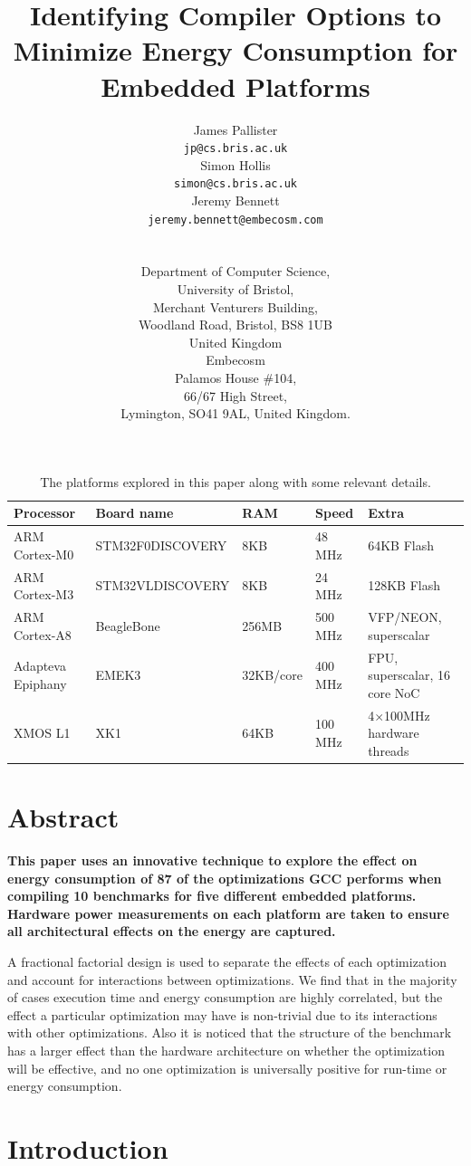 \documentclass[twocolumn]{article}
\title{\bfseries\fontsize{20}{1}\selectfont Identifying Compiler Options to Minimize Energy Consumption for Embedded Platforms}
\author{
\parbox{0.33\linewidth}{\centering\fontsize{13}{1}\selectfont James Pallister\\[0.5em]\texttt{jp@cs.bris.ac.uk}}
\parbox{0.33\linewidth}{\centering\fontsize{13}{1}\selectfont Simon Hollis\\[0.5em]\texttt{simon@cs.bris.ac.uk}}
\parbox{0.33\linewidth}{\centering\fontsize{13}{1}\selectfont Jeremy Bennett\\[0.5em]\texttt{jeremy.bennett@embecosm.com}} \\[1.5em]
\parbox{0.66\linewidth}{\centering\fontsize{12}{1}\selectfont
Department of Computer Science, \\
University of Bristol, \\
Merchant Venturers Building, \\
Woodland Road, Bristol, BS8 1UB\\
United Kingdom}
\parbox{0.33\linewidth}{\centering\fontsize{13}{1}\selectfont
Embecosm \\
Palamos House \#104, \\
66/67 High Street, \\
Lymington, SO41 9AL, United Kingdom. \\
}
}
\date{}
\let\oldcaption\caption
\renewcommand{\caption}[1]{\oldcaption{\textup{#1}}}
\begin{document}
\maketitle
\begin{table}[!hbt]
	\centering
	\begin{tabular}{l l l l l}
		\textbf{Processor} & \textbf{Board name}  & \textbf{RAM} & \textbf{Speed} & \textbf{Extra} \\
		\hline
		ARM Cortex-M0 	 & STM32F0DISCOVERY		& 8KB		& 48 MHz		  & 64KB Flash\\
		ARM Cortex-M3 	 & STM32VLDISCOVERY		& 8KB		& 24 MHz		  & 128KB Flash\\
		ARM Cortex-A8 	 & BeagleBone			& 256MB		& 500 MHz		  & VFP/NEON, superscalar\\
		Adapteva Epiphany 	 & EMEK3				& 32KB/core & 400 MHz		  & FPU, superscalar, 16 core NoC\\
		XMOS L1 		 & XK1					& 64KB		& 100 MHz 		& 4$\times$100MHz hardware threads \\
	\end{tabular}
	\caption{The platforms explored in this paper along with some relevant details.}
	\label{Table:Platforms}
\end{table}

\section{Abstract}
\raggedbottom
{\bfseries
This paper uses an innovative technique to explore the effect on energy consumption of 87 of the optimizations GCC performs when compiling 10 benchmarks for five different embedded platforms. Hardware power measurements on each platform are taken to ensure all architectural effects on the energy are captured.

A fractional factorial design is used to separate the effects of each optimization and account for interactions between optimizations. We find that in the majority of cases execution time and energy consumption are highly correlated, but the effect a particular optimization may have is non-trivial due to its interactions with other optimizations. Also it is noticed that the structure of the benchmark has a larger effect than the hardware architecture on whether the optimization will be effective, and no one optimization is universally positive for run-time or energy consumption.
}

\section{Introduction}
\end{document}
